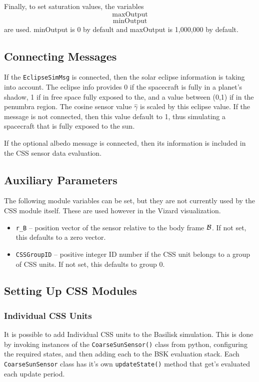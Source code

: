 Finally, to set saturation values, the variables
$$
	\mathrm{maxOutput}
	$$
	$$
	\mathrm{minOutput}
$$
are used. minOutput is  0 by default and maxOutput is 1,000,000 by default.

\subsection{Connecting Messages}
If the {\tt EclipseSimMsg} is connected, then the solar eclipse information is taking into account.  The eclipse info provides 0 if the spacecraft is fully in a planet's shadow, 1 if in free space fully exposed to the, and a value between (0,1) if in the penumbra region.  The cosine sensor value $\hat\gamma$ is scaled by this eclipse value.  If the message is not connected, then this value default to 1, thus simulating a spacecraft that is fully exposed to the sun.

If the optional albedo message is connected, then its information is included in the CSS sensor data evaluation.

\subsection{Auxiliary Parameters}
The following module variables can be set, but they are not currently used by the CSS module itself.  These are used however in the Vizard visualization.
\begin{itemize}
	\item {\tt r\_B} -- position vector of the sensor relative to the body frame $\cal B$.  If not set, this defaults to a zero vector.
	\item {\tt CSSGroupID} -- positive integer ID number if the CSS unit belongs to a group of CSS units.  If not set, this defaults to group 0.
\end{itemize}


\subsection{Setting Up CSS Modules}
\subsubsection{Individual CSS Units}
It is possible to add Individual CSS units to the Basilisk simulation.   This is done by invoking instances of the {\tt CoarseSunSensor()} class from python, configuring the required states, and then adding each to the BSK evaluation stack.  Each {\tt CoarseSunSensor} class has it's own {\tt updateState()} method that get's evaluated each update period.

